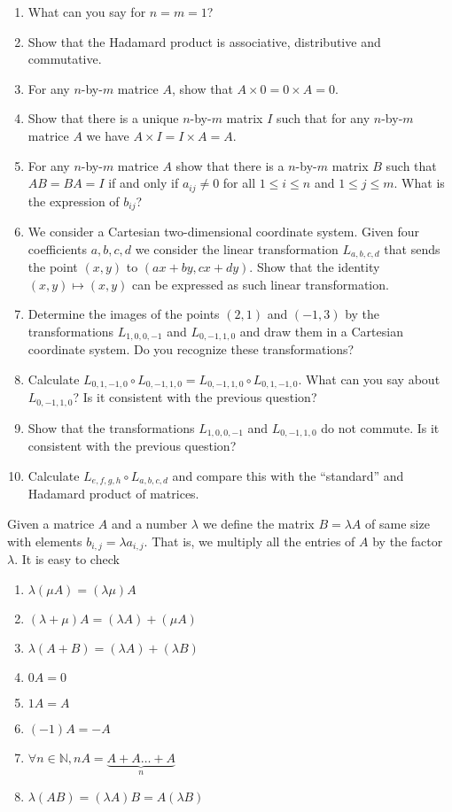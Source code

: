 \begin{enumerate}
\item What can you say for $n = m = 1$?
\item Show that the Hadamard product is associative, distributive and
  commutative.
\item For any $n$-by-$m$ matrice $A$, show that $A \times 0 = 0 \times A  = 0$.
\item Show that there is a unique $n$-by-$m$ matrix $I$ such that for any
  $n$-by-$m$ matrice $A$ we have $A \times I = I \times A = A$.
\item For any $n$-by-$m$ matrice $A$ show that there is a
  $n$-by-$m$ matrix $B$
  such that $A B = B A = I$ if and only if $a_{ij} \neq 0$ for all
  $1 \leq i \leq n$ and $1 \leq j \leq m$. What is the expression of $b_{ij}$?
\item We consider a Cartesian two-dimensional coordinate system.
  Given four coefficients $a,b,c,d$ we consider the linear transformation
  $L_{a,b,c,d}$ that sends the point $(x,y)$ to
  $({ax+by},{cx+dy})$. Show that the identity $(x,y) \mapsto (x,y)$ can be
  expressed as such linear transformation.
\item Determine the images of the points $(2,1)$ and $(-1,3)$ by the
  transformations $L_{1,0,0,-1}$ and $L_{0,-1,1,0}$ and draw
  them in a Cartesian coordinate system. Do you recognize these transformations?
\item Calculate $L_{0,1,-1,0} \circ L_{0,-1,1,0} =
  L_{0,-1,1,0} \circ L_{0,1,-1,0}$. What can you say about $L_{0,-1,1,0}$? Is
  it consistent with the previous question?
\item Show that the transformations $L_{1,0,0,-1}$ and $L_{0,-1,1,0}$
  do not commute.  Is it consistent with the previous question?
\item Calculate ${L_{e,f,g,h}} \circ {L_{a,b,c,d}}$ and compare this with the
  ``standard'' and Hadamard product of matrices.
\end{enumerate}

Given a matrice $A$ and a number $\lambda$ we define the
matrix $B = \lambda A$ of same size with elements
$b_{i,j} = \lambda a_{i,j}$. That is, we multiply all the entries of
$A$ by the factor $\lambda$. It is easy to check
\begin{enumerate}
\item $\lambda(\mu A) = (\lambda \mu) A$
\item $(\lambda + \mu) A = (\lambda A) + (\mu A)$
\item $\lambda (A + B) = (\lambda A) + (\lambda B)$
\item $0 A = 0$
\item $1 A = A$
\item $(-1) A = -A$
\item $\forall n \in \mathbb{N}, n A = \underset{n}{\underbrace{A + A \dots + A}}$
\item $\lambda (A B) = (\lambda A) B = A (\lambda B)$
\end{enumerate}

